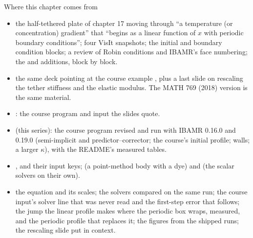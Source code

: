 \documentclass[aspectratio=169,11pt]{beamer}
\begin{document}
\begin{frame}{Where this chapter comes from}
\label{fr:sources}
\scriptsize
\begin{itemize}
  \item {} the half-tethered plate of chapter 17 moving through ``a temperature (or concentration) gradient'' that ``begins as a linear function of $x$ with periodic boundary conditions''; four VisIt snapshots; the initial and boundary condition blocks; a review of Robin conditions and IBAMR's face numbering; the  and  additions, block by block.
  \item {} the same deck pointing at the course example , plus a last slide on rescaling the tether stiffness and the elastic modulus. The MATH 769 (2018) version is the same material.
  \item {} : the course program and input the slides quote.
  \item {} (this series): the course program revised and run with IBAMR 0.16.0 and 0.19.0 (semi-implicit and predictor--corrector; the course's initial profile; walls; a larger $\kappa$), with the README's measured tables.
  \item {} ,  and their input keys;  (a point-method body with a dye) and  (the scalar solvers on their own).
  \item {} the equation and its scales; the solvers compared on the same run; the course input's solver line that was never read and the first-step error that follows; the jump the linear profile makes where the periodic box wraps, measured, and the periodic profile that replaces it; the figures from the shipped runs; the rescaling slide put in context.
\end{itemize}
\end{frame}
\end{document}
